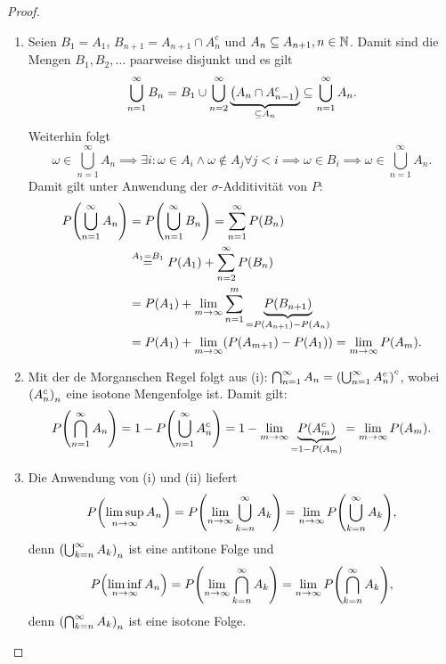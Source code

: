 \documentclass{lecture}
\begin{document}
    \begin{proof}
        \begin{enumerate}
            \item Seien \(B_1 = A_1\), \(B_{n + 1} = A_{n + 1} \cap A_n^c\) und \(A_n \subseteq A_{n + 1}, n \in \N\).
            Damit sind die Mengen \(B_1, B_2, \ldots\) paarweise disjunkt und es gilt
            \[
                \bigcup_{n = 1}^\infty B_n = B_1 \cup \bigcup_{n = 2}^\infty\underbrace{\parentheses*{A_n \cap A_{n - 1}^c}}_{\subseteq A_n} \subseteq \bigcup_{n = 1}^\infty A_n.
            \]
            Weiterhin folgt
            \[
                \omega \in \bigcup_{n = 1}^\infty A_n \implies \exists i: \omega \in A_i \land \omega \not\in A_j \forall j < i \implies \omega \in B_i \implies \omega \in \bigcup_{n = 1}^\infty A_n.
            \]
            Damit gilt unter Anwendung der \(\sigma\)-Additivität von \(P\):
            \begin{align*}
                P\parentheses*{\bigcup_{n = 1}^\infty A_n} &= P\parentheses*{\bigcup_{n = 1}^\infty B_n} = \sum_{n = 1}^\infty P\parentheses*{B_n}\\
                &\stackrel{A_1 = B_1}{=} P\parentheses*{A_1} + \sum_{n = 2}^\infty P\parentheses*{B_n}\\
                &= P\parentheses*{A_1} + \lim_{m \to \infty}\sum_{n = 1}^m\underbrace{P\parentheses*{B_{n + 1}}}_{= P\parentheses*{A_{n + 1}} - P\parentheses*{A_n}}\\
                &= P\parentheses*{A_1} + \lim_{m \to \infty}\parentheses*{P\parentheses*{A_{m + 1}} - P\parentheses*{A_1}} = \lim_{m \to \infty}P\parentheses*{A_m}.
            \end{align*}
            \item Mit der de Morganschen Regel folgt aus (i): \(\bigcap_{n = 1}^\infty A_n = \parentheses*{\bigcup_{n = 1}^\infty A_n^c}^c\), wobei \(\parentheses*{A_n^c}_n\) eine isotone Mengenfolge ist.
            Damit gilt:
            \[
                P\parentheses*{\bigcap_{n = 1}^\infty A_n} = 1 - P\parentheses*{\bigcup_{n = 1}^\infty A_n^c} = 1 - \lim_{m \to \infty}\underbrace{P\parentheses*{A_m^c}}_{= 1 - P\parentheses*{A_m}} = \lim_{m \to \infty}P\parentheses*{A_m}.
            \]
            \item Die Anwendung von (i) und (ii) liefert
            \[
                P\parentheses*{\limsup_{n \to \infty}A_n} = P\parentheses*{\lim_{n \to \infty}\bigcup_{k = n}^\infty A_k} = \lim_{n \to \infty}P\parentheses*{\bigcup_{k = n}^\infty A_k},
            \]
            denn \(\parentheses*{\bigcup_{k = n}^\infty A_k}_n\) ist eine antitone Folge und
            \[
                P\parentheses*{\liminf_{n \to \infty}A_n} = P\parentheses*{\lim_{n \to \infty}\bigcap_{k = n}^\infty A_k} = \lim_{n \to \infty}P\parentheses*{\bigcap_{k = n}^\infty A_k},
            \]
            denn \(\parentheses*{\bigcap_{k = n}^\infty A_k}_n\) ist eine isotone Folge.
        \end{enumerate}
    \end{proof}
\end{document}
